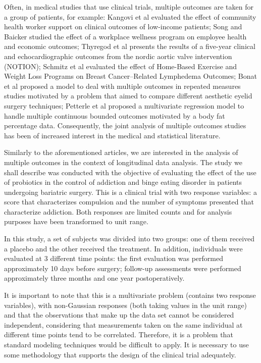 \documentclass[AMA,STIX1COL]{WileyNJD-v2}
\begin{document}
Often, in medical studies that use clinical trials, multiple outcomes are taken for a group of patients, for example: Kangovi et al \cite{kangovi2018effect} evaluated the effect of community health worker support on clinical outcomes of low-income patients; Song and Baicker \cite{song2019effect} studied the effect of a workplace wellness program on employee health and economic outcomes; Thyregod et al \cite{thyregod2019five} presents the results of a five-year clinical and echocardiographic outcomes from the nordic aortic valve intervention (NOTION); Schmitz et al \cite{schmitz2019effect} evaluated the effect of Home-Based Exercise and Weight Loss Programs on Breast Cancer–Related Lymphedema Outcomes; Bonat et al \cite{plastica} proposed a model to deal with multiple outcomes in repeated measures studies motivated by a problem that aimed to compare different aesthetic eyelid surgery techniques; Petterle et al \cite{petterle2021multivariate} proposed a multivariate regression model to handle multiple continuous bounded outcomes motivated by a body fat percentage data. Consequently, the joint analysis of multiple outcomes studies has been of increased interest in the medical and statistical literature. 


Similarly to the aforementioned articles, we are interested in the analysis of multiple outcomes in the context of longitudinal data analysis. The study we shall describe was conducted with the objective of evaluating the effect of the use of probiotics in the control of addiction and binge eating disorder in patients undergoing bariatric surgery. This is a clinical trial with two response variables: a score that characterizes compulsion and the number of symptoms presented that characterize addiction. Both responses are limited counts and for analysis purposes have been transformed to unit range.

In this study, a set of subjects was divided into two groups: one of them received a placebo and the other received the treatment. In addition, individuals were evaluated at 3 different time points: the first evaluation was performed approximately 10 days before surgery; follow-up assessments were performed approximately three months and one year postoperatively.


It is important to note that this is a multivariate problem (contains two response variables), with non-Gaussian responses (both taking values in the unit range) and that the observations that make up the data set cannot be considered independent, considering that measurements taken on the same individual at different time points tend to be correlated. Therefore, it is a problem that standard modeling techniques would be difficult to apply. It is necessary to use some methodology that supports the design of the clinical trial adequately.
\end{document}
